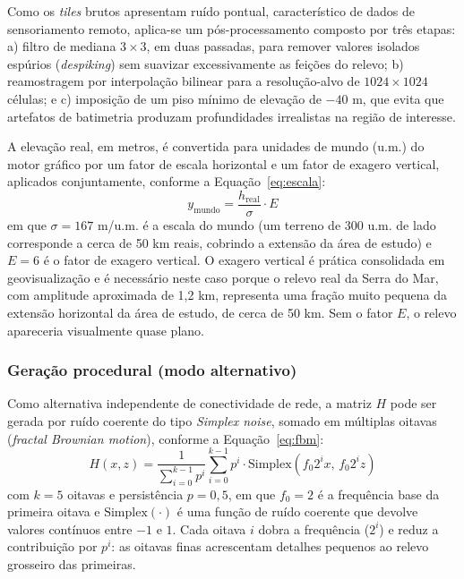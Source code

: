 \documentclass[conference]{IEEEtran}
\begin{document}
Como os \emph{tiles} brutos apresentam ruído pontual, característico de
dados de sensoriamento remoto, aplica-se um pós-processamento composto por
três etapas: a) filtro de mediana $3 \times 3$, em duas passadas, para
remover valores isolados espúrios (\emph{despiking}) sem suavizar
excessivamente as feições do relevo; b) reamostragem por interpolação
bilinear para a resolução-alvo de $1024 \times 1024$ células; e c)
imposição de um piso mínimo de elevação de $-40$ m, que evita que
artefatos de batimetria produzam profundidades irrealistas na região de
interesse.

A elevação real, em metros, é convertida para unidades de mundo (u.m.) do
motor gráfico por um fator de escala horizontal e um fator de exagero
vertical, aplicados conjuntamente, conforme a Equação~\eqref{eq:escala}:
\begin{equation}
y_{\text{mundo}} = \frac{h_{\text{real}}}{\sigma} \cdot E
\label{eq:escala}
\end{equation}
em que $\sigma = 167$ m/u.m. é a escala do mundo (um terreno de 300 u.m. de
lado corresponde a cerca de 50 km reais, cobrindo a extensão da área de
estudo) e $E = 6$ é o fator de exagero vertical. O exagero vertical é prática
consolidada em geovisualização e é necessário neste caso porque o relevo
real da Serra do Mar, com amplitude aproximada de 1,2 km, representa uma
fração muito pequena da extensão horizontal da área de estudo, de cerca de
50 km. Sem o fator $E$, o relevo apareceria visualmente quase plano.

\subsubsection{Geração procedural (modo alternativo)}
Como alternativa independente de conectividade de rede, a matriz $H$ pode
ser gerada por ruído coerente do tipo \emph{Simplex noise}, somado em
múltiplas oitavas (\emph{fractal Brownian motion}), conforme a
Equação~\eqref{eq:fbm}:
\begin{equation}
H(x,z) = \frac{1}{\sum_{i=0}^{k-1} p^i} \sum_{i=0}^{k-1} p^i \cdot
\text{Simplex}(f_0 2^i x,\, f_0 2^i z)
\label{eq:fbm}
\end{equation}
com $k = 5$ oitavas e persistência $p = 0{,}5$, em que $f_0 = 2$ é a
frequência base da primeira oitava e $\text{Simplex}(\cdot)$ é uma função de
ruído coerente que devolve valores contínuos entre $-1$ e $1$. Cada oitava
$i$ dobra a frequência ($2^i$) e reduz a contribuição por $p^i$: as oitavas
finas acrescentam detalhes pequenos ao relevo grosseiro das primeiras.
\end{document}
